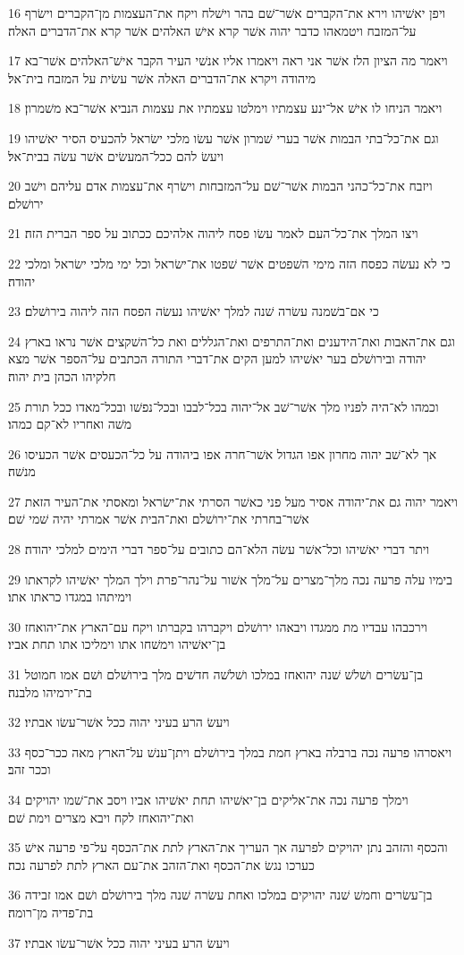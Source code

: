 \par 16 ויפן יאשׁיהו וירא את־הקברים אשׁר־שׁם בהר וישׁלח ויקח את־העצמות מן־הקברים וישׂרף על־המזבח ויטמאהו כדבר יהוה אשׁר קרא אישׁ האלהים אשׁר קרא את־הדברים האלה׃
\par 17 ויאמר מה הציון הלז אשׁר אני ראה ויאמרו אליו אנשׁי העיר הקבר אישׁ־האלהים אשׁר־בא מיהודה ויקרא את־הדברים האלה אשׁר עשׂית על המזבח בית־אל׃
\par 18 ויאמר הניחו לו אישׁ אל־ינע עצמתיו וימלטו עצמתיו את עצמות הנביא אשׁר־בא משׁמרון׃
\par 19 וגם את־כל־בתי הבמות אשׁר בערי שׁמרון אשׁר עשׂו מלכי ישׂראל להכעיס הסיר יאשׁיהו ויעשׂ להם ככל־המעשׂים אשׁר עשׂה בבית־אל׃
\par 20 ויזבח את־כל־כהני הבמות אשׁר־שׁם על־המזבחות וישׂרף את־עצמות אדם עליהם וישׁב ירושׁלם׃
\par 21 ויצו המלך את־כל־העם לאמר עשׂו פסח ליהוה אלהיכם ככתוב על ספר הברית הזה׃
\par 22 כי לא נעשׂה כפסח הזה מימי השׁפטים אשׁר שׁפטו את־ישׂראל וכל ימי מלכי ישׂראל ומלכי יהודה׃
\par 23 כי אם־בשׁמנה עשׂרה שׁנה למלך יאשׁיהו נעשׂה הפסח הזה ליהוה בירושׁלם׃
\par 24 וגם את־האבות ואת־הידענים ואת־התרפים ואת־הגללים ואת כל־השׁקצים אשׁר נראו בארץ יהודה ובירושׁלם בער יאשׁיהו למען הקים את־דברי התורה הכתבים על־הספר אשׁר מצא חלקיהו הכהן בית יהוה׃
\par 25 וכמהו לא־היה לפניו מלך אשׁר־שׁב אל־יהוה בכל־לבבו ובכל־נפשׁו ובכל־מאדו ככל תורת משׁה ואחריו לא־קם כמהו׃
\par 26 אך לא־שׁב יהוה מחרון אפו הגדול אשׁר־חרה אפו ביהודה על כל־הכעסים אשׁר הכעיסו מנשׁה׃
\par 27 ויאמר יהוה גם את־יהודה אסיר מעל פני כאשׁר הסרתי את־ישׂראל ומאסתי את־העיר הזאת אשׁר־בחרתי את־ירושׁלם ואת־הבית אשׁר אמרתי יהיה שׁמי שׁם׃
\par 28 ויתר דברי יאשׁיהו וכל־אשׁר עשׂה הלא־הם כתובים על־ספר דברי הימים למלכי יהודה׃
\par 29 בימיו עלה פרעה נכה מלך־מצרים על־מלך אשׁור על־נהר־פרת וילך המלך יאשׁיהו לקראתו וימיתהו במגדו כראתו אתו׃
\par 30 וירכבהו עבדיו מת ממגדו ויבאהו ירושׁלם ויקברהו בקברתו ויקח עם־הארץ את־יהואחז בן־יאשׁיהו וימשׁחו אתו וימליכו אתו תחת אביו׃
\par 31 בן־עשׂרים ושׁלשׁ שׁנה יהואחז במלכו ושׁלשׁה חדשׁים מלך בירושׁלם ושׁם אמו חמוטל בת־ירמיהו מלבנה׃
\par 32 ויעשׂ הרע בעיני יהוה ככל אשׁר־עשׂו אבתיו׃
\par 33 ויאסרהו פרעה נכה ברבלה בארץ חמת במלך בירושׁלם ויתן־ענשׁ על־הארץ מאה ככר־כסף וככר זהב׃
\par 34 וימלך פרעה נכה את־אליקים בן־יאשׁיהו תחת יאשׁיהו אביו ויסב את־שׁמו יהויקים ואת־יהואחז לקח ויבא מצרים וימת שׁם׃
\par 35 והכסף והזהב נתן יהויקים לפרעה אך העריך את־הארץ לתת את־הכסף על־פי פרעה אישׁ כערכו נגשׂ את־הכסף ואת־הזהב את־עם הארץ לתת לפרעה נכה׃
\par 36 בן־עשׂרים וחמשׁ שׁנה יהויקים במלכו ואחת עשׂרה שׁנה מלך בירושׁלם ושׁם אמו זבידה בת־פדיה מן־רומה׃
\par 37 ויעשׂ הרע בעיני יהוה ככל אשׁר־עשׂו אבתיו׃

